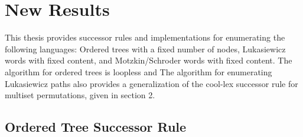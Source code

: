 \section{New Results}

This thesis provides successor rules and implementations for enumerating the following languages: Ordered trees with a fixed number of nodes, Lukasiewicz words with fixed content, and Motzkin/Schroder words with fixed content. %
The algorithm for ordered trees is loopless and 
The algorithm for enumerating Lukasiewicz paths also provides a generalization of the cool-lex successor rule for multiset permutations, given in section 2. %

\subsection{Ordered Tree Successor Rule}



% 

